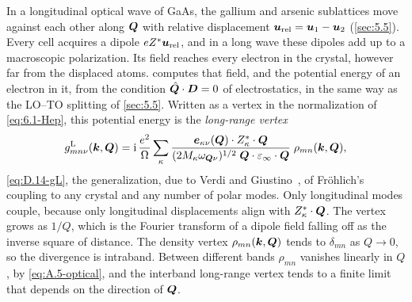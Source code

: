In a longitudinal optical wave of GaAs, the gallium and arsenic sublattices move against each other along $\bm{Q}$ with relative displacement $\bm{u}_{\mathrm{rel}} = \bm{u}_1 - \bm{u}_2$ (\cref{sec:5.5}). Every cell acquires a dipole $eZ^*\bm{u}_{\mathrm{rel}}$, and in a long wave these dipoles add up to a macroscopic polarization. Its field reaches every electron in the crystal, however far from the displaced atoms.  computes that field, and the potential energy of an electron in it, from the condition $\hat{\bm{Q}}\cdot\bm{D} = 0$ of electrostatics, in the same way as the LO--TO splitting of \cref{sec:5.5}. Written as a vertex in the normalization of \cref{eq:6.1-Hep}, this potential energy is the \emph{long-range vertex}
\begin{equation*}
  g^{\mathrm{L}}_{mn\nu}(\bm{k},\bm{Q}) = \mathrm{i}\,\frac{e^2}{\Omega}\sum_\kappa\frac{\bm{e}_{\kappa\nu}(\bm{Q})\cdot Z^*_\kappa\cdot\bm{Q}}{(2M_\kappa\omega_{\bm{Q}\nu})^{1/2}\;\bm{Q}\cdot\varepsilon_\infty\cdot\bm{Q}}\;\rho_{mn}(\bm{k},\bm{Q}) ,
\end{equation*}
\cref{eq:D.14-gL}, the generalization, due to Verdi and Giustino~\cite[Eq.~(4)]{verdi2015frohlich}, of Fr\"ohlich's coupling to any crystal and any number of polar modes. Only longitudinal modes couple, because only longitudinal displacements align with $Z^*_\kappa\cdot\bm{Q}$. The vertex grows as $1/Q$, which is the Fourier transform of a dipole field falling off as the inverse square of distance. The density vertex $\rho_{mn}(\bm{k},\bm{Q})$ tends to $\delta_{mn}$ as $Q \to 0$, so the divergence is intraband. Between different bands $\rho_{mn}$ vanishes linearly in $Q$, by \cref{eq:A.5-optical}, and the interband long-range vertex tends to a finite limit that depends on the direction of $\bm{Q}$.

